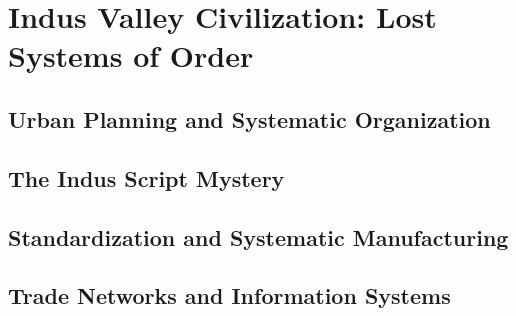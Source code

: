 


\chapter{Indus Valley Civilization: Lost Systems of Order}

\section{Urban Planning and Systematic Organization}

\section{The Indus Script Mystery}

\section{Standardization and Systematic Manufacturing}

\section{Trade Networks and Information Systems}
